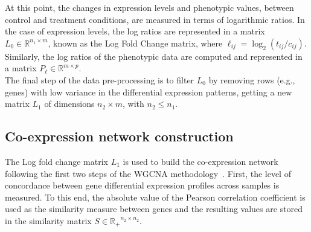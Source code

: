 \documentclass[12pt,journal, onecolumn]{IEEEtran}
\begin{document}

At this point, the changes in expression levels and phenotypic values, between control and treatment conditions, are measured in terms of logarithmic ratios. In the case of expression levels, the log ratios are represented in a matrix $L_0 \in \mathbb{R}^{n_1 \times m}$, known as the Log Fold Change matrix, where $\ell_{ij}=\log_2 (t_{ij}/c_{ij})$. Similarly, the log ratios of the phenotypic data are computed and represented in a matrix $P_\ell \in \mathbb{R}^{m \times p}$.\\

The final step of the data pre-processing is to filter $L_0$ by removing rows (e.g., genes) with low variance in the differential expression patterns, getting a new matrix $L_1$ of dimensions $n_2 \times m$, with $n_2 \leq n_1$.\\


\subsection{Co-expression network construction}

The Log fold change matrix $L_1$ is used to build the co-expression network following the first two steps of the WGCNA methodology~\cite{langfelder2008wgcna}. First, the level of concordance between gene differential expression profiles across samples is measured. To this end, the absolute value of the Pearson correlation coefficient is used as the similarity measure between genes and the resulting values are stored in the similarity matrix $S\in \mathbb{R_{+}}^{n_2 \times n_2}$.\\
\end{document}

